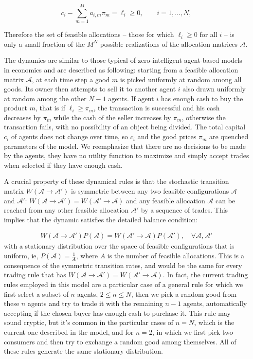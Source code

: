 \begin{equation}
c_i -  \sum_{m=1}^M a_{i , m} \pi_m =\ell_i\ge 0, \quad\quad i=1,\ldots,N,
\label{eq:1}
\end{equation}

Therefore the set of feasible allocations -- those for which $\ell_i\ge 0$ for all $i$ -- is only a small fraction of the $M^N$ possible realizations of the allocation matrices $\mathcal{A}$. 

The dynamics are similar to those typical of zero-intelligent agent-based models in economics and are described as following: starting from a feasible allocation matrix $\mathcal{A}$, at each time step a good $m$ is picked uniformly at random among all goods. Its owner then attempts to sell it to another agent $i$ also drawn uniformly at random among the other $N-1$ agents. If agent $i$ has enough cash to buy the product $m$, that is if $\ell_i \ge \pi_m$, the transaction is successful and his cash decreases by $\pi_m$ while the cash of the seller increases by $\pi_m$, otherwise the transaction fails, with no possibility of an object being divided. The total capital $c_i$ of agents does not change over time, so $c_i$ and the good prices $\pi_m$ are quenched parameters of the model. We reemphasize that there are no decisions to be made by the agents, they have no utility function to maximize and simply accept trades when selected if they have enough cash.

A crucial property of these dynamical rules is that the stochastic transition matrix $W(\mathcal{A}\to\mathcal{A}')$ is symmetric between any two feasible configurations $\mathcal{A}$ and $\mathcal{A}'$: $W(\mathcal{A}\to \mathcal{A}') = W(\mathcal{A}'\to \mathcal{A})$ and any feasible allocation $\mathcal{A}$ can be reached from any other feasible allocation $\mathcal{A}'$ by a sequence of trades. This implies that the dynamic satisfies the detailed balance condition:

\begin{align}
W(\mathcal{A} \to \mathcal{A}') P(\mathcal{A}) = W(\mathcal{A}'\to \mathcal{A})P(\mathcal{A}'),  \quad \forall \mathcal{A}, \mathcal{A}'
\end{align}
with a stationary distribution over the space of feasible configurations that is uniform, ie, $P(\mathcal{A})= \frac{1}{A}$, where $A$ is the number of feasible allocations. This is a consequence of the symmetric transition rates, and would be the same for every trading rule that has $W(\mathcal{A}\to \mathcal{A}') = W(\mathcal{A}'\to \mathcal{A})$. In fact, the current trading rules employed in this model are a particular case of a general rule for which we first select a subset of $n$ agents, $2 \leq n \leq N$, then we pick a random good from these $n$ agents and try to trade it with the remaining $n-1$ agents, automatically accepting if the chosen buyer has enough cash to purchase it. This rule may sound cryptic, but it's common in the particular cases of $n=N$, which is the current one described in the model, and for $n=2$, in which we first pick two consumers and then try to exchange a random good among themselves. All of these rules generate the same stationary distribution.

